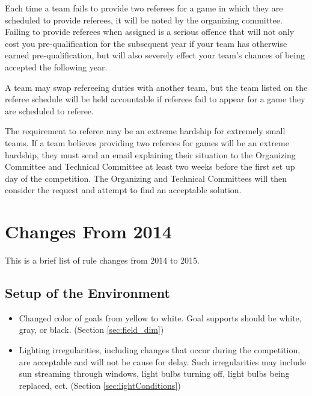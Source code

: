\documentclass[12pt]{article}
\begin{document}
Each time a team fails to provide two referees for a game in which they are scheduled to provide referees, it will be noted by the organizing committee.  Failing to provide referees when assigned is a serious offence that will not only cost you pre-qualification for the subsequent year if your team has otherwise earned pre-qualification, but will also severely effect your team's chances of being accepted the following year.

A team may swap refereeing duties with another team, but the team listed on the referee schedule will be held accountable if referees fail to appear for a game they are scheduled to referee.

The requirement to referee may be an extreme hardship for extremely small teams.  If a team believes providing two referees for games will be an extreme hardship, they must send an email explaining their situation to the Organizing Committee and Technical Committee at least two weeks before the first set up day of the competition.  The Organizing and Technical Committees will then consider the request and attempt to find an acceptable solution.


\newpage


\section{Changes From 2014}
This is a brief list of rule changes from 2014 to 2015.

\subsection*{Setup of the Environment}
\begin{itemize}
	\item Changed color of goals from yellow to white. Goal supports should be white, gray, or black. (Section \ref{sec:field_dim})
	\item Lighting irregularities, including changes that occur during the competition, are acceptable and will not be cause for delay.  Such irregularities may include sun streaming through windows, light bulbs turning off, light bulbs being replaced, ect. (Section \ref{sec:lightConditions})
\end{itemize}
\end{document}
